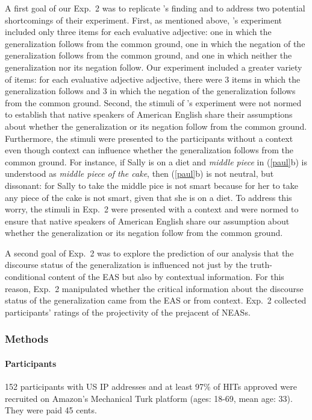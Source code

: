 \documentclass[11pt,fleqn]{article}
\newcommand{\6}{\mbox{$[\hspace*{-.6mm}[$}}
\newcommand{\9}{\mbox{$]\hspace*{-.6mm}]$}}
\newcommand{\citepos}[1]{\citeauthor{#1}'s \citeyear{#1}}
\begin{document}
A first goal of our Exp.~2 was to replicate \citepos{karttunen-etal2014} finding and to address two potential shortcomings of their experiment. First, as mentioned above, \citepos{karttunen-etal2014} experiment included only three items for each evaluative adjective: one in which the generalization follows from the common ground, one in which the negation of the generalization follows from the common ground, and one in which neither the generalization nor its negation follow. Our experiment included a greater variety of items: for each evaluative adjective adjective, there were 3 items in which the generalization follows and 3 in which the negation of the generalization follows from the common ground. Second, the stimuli of  \citepos{karttunen-etal2014} experiment were not normed to establish that native speakers of American English share their assumptions about whether the generalization or its negation follow from the common ground. Furthermore, the stimuli were
presented to the participants without a context even though context can influence whether the generalization follows from the common ground. For instance, if Sally is on a diet and {\em middle piece} in (\ref{paul}b) is understood as {\em middle piece of the cake}, then (\ref{paul}b) is not neutral, but dissonant: for Sally to take the middle pice is not smart because for her to take any piece of the cake is not smart, given that she is on a diet. To address this worry, the stimuli in Exp.~2 were presented with a context and were normed to ensure that native speakers of American English share our assumption about whether the generalization or its negation follow from the common ground.

A second goal of Exp.~2 was to explore the prediction of our analysis that the discourse status of the generalization is influenced not just by the truth-conditional content of the EAS but also by contextual information. For this reason, Exp.~2 manipulated whether the critical information about the discourse status of the generalization came from the EAS or from context. Exp.~2 collected participants' ratings of the projectivity of the prejacent of NEASs.

\subsubsection{Methods}

\paragraph{Participants} 152 participants with US IP addresses and at least 97\% of HITs approved were recruited on Amazon's Mechanical Turk platform (ages: 18-69, mean age: 33). They were paid 45 cents.
\end{document}
